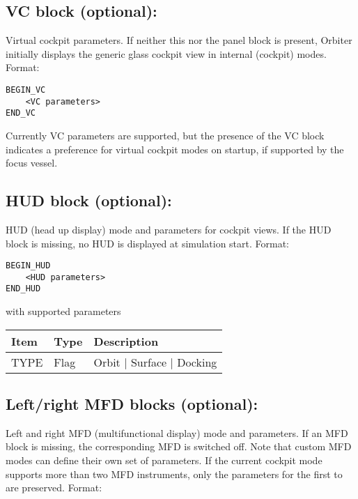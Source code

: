 \documentclass[Orbiter Developer Manual.tex]{subfiles}
\begin{document}
\subsection*{VC block (optional):}
Virtual cockpit parameters. If neither this nor the panel block is present, Orbiter initially displays the generic glass cockpit view in internal (cockpit) modes. Format:

\begin{lstlisting}[language=OSFS]
BEGIN_VC
	<VC parameters>
END_VC
\end{lstlisting}

\noindent
Currently VC parameters are supported, but the presence of the VC block indicates a preference for virtual cockpit modes on startup, if supported by the focus vessel.


\subsection*{HUD block (optional):}
HUD (head up display) mode and parameters for cockpit views. If the HUD block is missing, no HUD is displayed at simulation start. Format:

\begin{lstlisting}[language=OSFS]
BEGIN_HUD
	<HUD parameters>
END_HUD
\end{lstlisting}

\noindent
with supported parameters

\begin{table}[H]
	\centering
	\begin{tabularx}{\textwidth}{ |l|l|X| }
	\hline\rule{0pt}{2ex}
	\textbf{Item} & \textbf{Type} & \textbf{Description}\\
	\hline\rule{0pt}{2ex}
	TYPE & Flag & Orbit | Surface | Docking\\
	\hline
	\end{tabularx}
\end{table}

\subsection*{Left/right MFD blocks (optional):}
Left and right MFD (multifunctional display) mode and parameters. If an MFD block is missing, the corresponding MFD is switched off. Note that custom MFD modes can define their own set of parameters. If the current cockpit mode supports more than two MFD instruments, only the parameters for the first to are preserved. Format:
\end{document}
